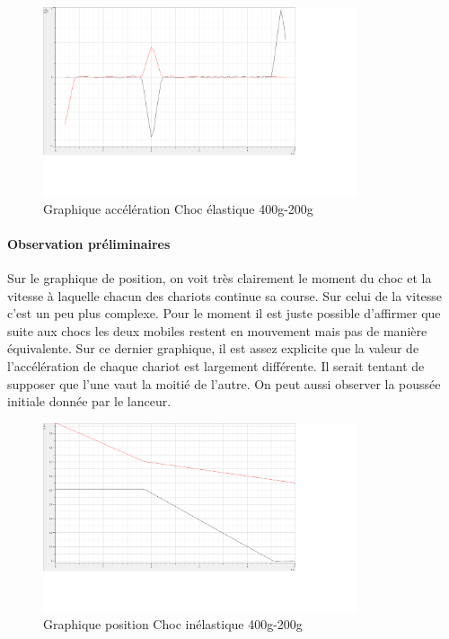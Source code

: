 \begin{figure}[h]
    \caption[Graphique accélération Choc élastique 400g-200g]{Graphique accélération Choc élastique 400g-200g}
    \centering
    \includegraphics[height=15em]{Data/400-200ela02a.png}
\end{figure}

\paragraph{Observation préliminaires}
Sur le graphique de position, on voit très clairement le moment du choc et la vitesse à laquelle chacun des chariots continue sa course.
Sur celui de la vitesse c'est un peu plus complexe. Pour le moment il est juste possible d'affirmer que suite aux chocs les deux mobiles restent en mouvement mais pas de manière équivalente.
Sur ce dernier graphique, il est assez explicite que la valeur de l'accélération de chaque chariot est largement différente. Il serait tentant de supposer que l'une vaut la moitié de l'autre. On peut aussi observer la poussée initiale donnée par le lanceur.

\begin{figure}[h]
    \caption[Graphique position Choc inélastique 400g-200g]{Graphique position Choc inélastique 400g-200g}
    \centering
    \includegraphics[height=15em]{Data/400-200ela01.png}
\end{figure}

